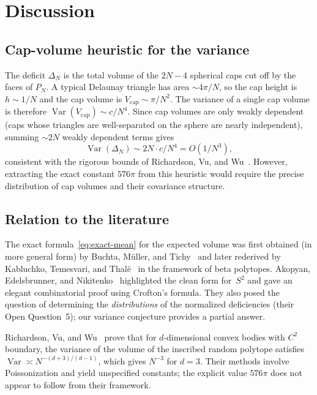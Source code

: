 \documentclass[11pt]{article}
\begin{document}
\section{Discussion}

\subsection{Cap-volume heuristic for the variance}

The deficit $\Delta_N$ is the total volume of the $2N-4$ spherical
caps cut off by the faces of $P_N$.  A typical Delaunay triangle
has area $\sim 4\pi/N$, so the cap height is $h \sim 1/N$ and
the cap volume is $V_{\mathrm{cap}} \sim \pi/N^2$.  The variance
of a single cap volume is therefore $\operatorname{Var}(V_{\mathrm{cap}})
\sim c/N^4$.  Since cap volumes are only weakly dependent (caps
whose triangles are well-separated on the sphere are nearly
independent), summing $\sim 2N$ weakly dependent terms gives
\[
  \operatorname{Var}(\Delta_N) \sim 2N \cdot c/N^4 = O(1/N^3),
\]
consistent with the rigorous bounds of Richardson, Vu, and
Wu~\cite{RVW2008}.  However, extracting the exact constant
$576\pi$ from this heuristic would require the precise
distribution of cap volumes and their covariance structure.

\subsection{Relation to the literature}

The exact formula~\eqref{eq:exact-mean} for the expected volume
was first obtained (in more general form) by Buchta, M\"uller,
and Tichy~\cite{BMT1985} and later rederived by Kabluchko,
Temesvari, and Thal\"e~\cite{KTT2019} in the framework of beta
polytopes.  Akopyan, Edelsbrunner, and Nikitenko~\cite{AEN2021}
highlighted the clean form for~$S^2$ and gave an elegant
combinatorial proof using Crofton's formula.  They also posed
the question of determining the \emph{distributions} of the
normalized deficiencies (their Open Question~5); our variance
conjecture provides a partial answer.

Richardson, Vu, and Wu~\cite{RVW2008} prove that for
$d$-dimensional convex bodies with $C^2$ boundary, the variance
of the volume of the inscribed random polytope satisfies
$\operatorname{Var} \asymp N^{-(d+3)/(d-1)}$, which gives
$N^{-3}$ for $d = 3$.  Their methods involve Poissonization and
yield unspecified constants; the explicit value $576\pi$ does not
appear to follow from their framework.
\end{document}
